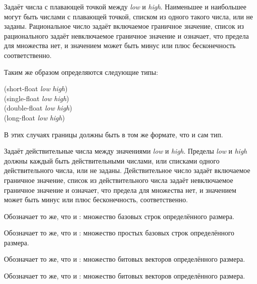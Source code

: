\begin{flushdesc}
\item[\cd{(float \emph{low} \emph{high})}]
  Задаёт числа с плавающей точкой  между \emph{low} и
  \emph{high}. Наименьшее и наибольшее могут быть числами с плавающей точкой, списком
  из одного такого числа, или не заданы.
  Рациональное число задаёт включаемое граничное значение, список из
  рационального задаёт невключаемое граничное значение и \cd{*} означает, что
  предела для множества нет, и значением может быть минус или плюс бесконечность
  соответственно.

  Таким же образом определяются следующие типы:
  \begin{lisp}
    (short-float \emph{low} \emph{high}) \\
    (single-float \emph{low} \emph{high}) \\
    (double-float \emph{low} \emph{high}) \\
    (long-float \emph{low} \emph{high})
  \end{lisp}
  В этих случаях границы должны быть в том же формате, что и сам тип.

\item[\cd{(real \emph{low} \emph{high})}]
  Задаёт действительные числа между значениями \emph{low} и \emph{high}. Пределы
  \emph{low} и \emph{high} должны каждый быть действительными числами, или
  списками одного действительного числа, или не заданы.
  Действительное число задаёт включаемое граничное значение, список из
  действительного числа задаёт невключаемое граничное значение и \cd{*} означает,
  что предела для множества нет, и значением может быть минус или плюс
  бесконечность, соответственно.

\item[\cd{(base-string \emph{size})}]
  Обозначает то же, что и : множество
  базовых строк определённого размера.

\item[\cd{(simple-base-string \emph{size})}]
  Обозначает то же, что и : множество
  простых базовых строк определённого размера.

\item[\cd{(bit-vector \emph{size})}]
  Обозначает то же, что и : множество битовых
  векторов определённого размера.

\item[\cd{(simple-bit-vector \emph{size})}]
  Обозначает то же, что и : множество битовых
  векторов определённого размера.
\end{flushdesc}


